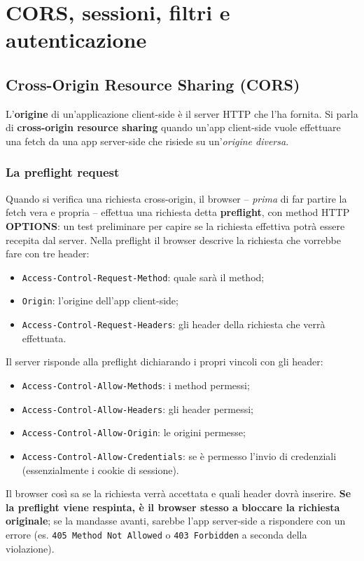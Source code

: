 \chapter{CORS, sessioni, filtri e autenticazione}

\section{Cross-Origin Resource Sharing (CORS)}

\begin{definizione}
L'\textbf{origine} di un'applicazione client-side \`e il server HTTP che l'ha fornita.
Si parla di \textbf{cross-origin resource sharing} quando un'app client-side vuole effettuare
una fetch da una app server-side che risiede su un'\emph{origine diversa}.
\end{definizione}

\subsection{La preflight request}
Quando si verifica una richiesta cross-origin, il browser -- \emph{prima} di far partire la
fetch vera e propria -- effettua una richiesta detta \textbf{preflight}, con method HTTP
\textbf{OPTIONS}: un test preliminare per capire se la richiesta effettiva potr\`a essere
recepita dal server. Nella preflight il browser descrive la richiesta che vorrebbe fare con
tre header:
\begin{itemize}
  \item \texttt{Access-Control-Request-Method}: quale sar\`a il method;
  \item \texttt{Origin}: l'origine dell'app client-side;
  \item \texttt{Access-Control-Request-Headers}: gli header della richiesta che verr\`a
        effettuata.
\end{itemize}
Il server risponde alla preflight dichiarando i propri vincoli con gli header:
\begin{itemize}
  \item \texttt{Access-Control-Allow-Methods}: i method permessi;
  \item \texttt{Access-Control-Allow-Headers}: gli header permessi;
  \item \texttt{Access-Control-Allow-Origin}: le origini permesse;
  \item \texttt{Access-Control-Allow-Credentials}: se \`e permesso l'invio di credenziali
        (essenzialmente i cookie di sessione).
\end{itemize}
Il browser cos\`i sa se la richiesta verr\`a accettata e quali header dovr\`a inserire.
\textbf{Se la preflight viene respinta, \`e il browser stesso a bloccare la richiesta
originale}; se la mandasse avanti, sarebbe l'app server-side a rispondere con un errore
(es. \texttt{405 Method Not Allowed} o \texttt{403 Forbidden} a seconda della violazione).

